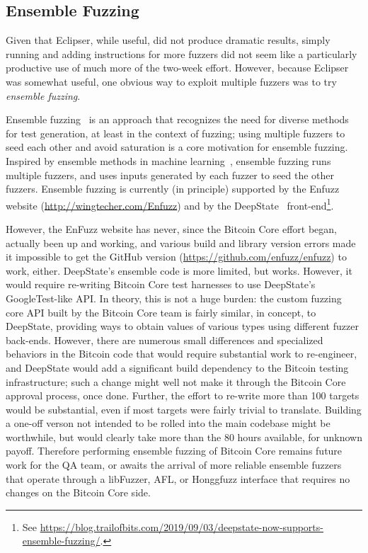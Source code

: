 \subsection{Ensemble Fuzzing}

Given that Eclipser, while useful, did not produce dramatic results, simply running and adding instructions for more fuzzers did not seem like a particularly productive use of much more of the two-week effort.  However, because Eclipser was somewhat useful, one obvious way to exploit multiple fuzzers was to try \emph{ensemble fuzzing}.

Ensemble fuzzing~\cite{chen2019enfuzz} is an approach that recognizes the need for
diverse methods for test generation, at least in the context of
fuzzing; using multiple fuzzers to seed each other and avoid saturation is a core motivation for ensemble fuzzing.   Inspired by ensemble methods in machine learning~\cite{dietterich2002ensemble},
ensemble fuzzing runs multiple fuzzers, and uses inputs generated by
each fuzzer to seed the other fuzzers.  Ensemble fuzzing is currently (in principle)
supported by the Enfuzz website  (\url{http://wingtecher.com/Enfuzz})
and by the DeepState~\cite{goodman2018deepstate} front-end\footnote{See
  \url{https://blog.trailofbits.com/2019/09/03/deepstate-now-supports-ensemble-fuzzing/}.}.

However, the EnFuzz website has never, since the Bitcoin Core effort began, actually been up and working, and various build and library version errors made it impossible to get the GitHub version (\url{https://github.com/enfuzz/enfuzz}) to work, either.  DeepState's ensemble code is more limited, but works.  However, it would require re-writing Bitcoin Core test harnesses to use DeepState's GoogleTest-like API.  In theory, this is not a huge burden: the custom fuzzing core API built by the Bitcoin Core team is fairly similar, in concept, to DeepState, providing ways to obtain values of various types using different fuzzer back-ends.  However, there are numerous small differences and specialized behaviors in the Bitcoin code that would require substantial work to re-engineer, and DeepState would add a significant build dependency to the Bitcoin testing infrastructure; such a change might well not make it through the Bitcoin Core approval process, once done.   Further, the effort to re-write more than 100 targets would be substantial, even if most targets were fairly trivial to translate. Building a one-off verson not intended to be rolled into the main codebase might be worthwhile, but would clearly take more than the 80 hours available, for unknown payoff.   Therefore performing ensemble fuzzing of Bitcoin Core remains future work for the QA team, or awaits the arrival of more reliable ensemble fuzzers that operate through a libFuzzer, AFL, or Honggfuzz interface that requires no changes on the Bitcoin Core side.